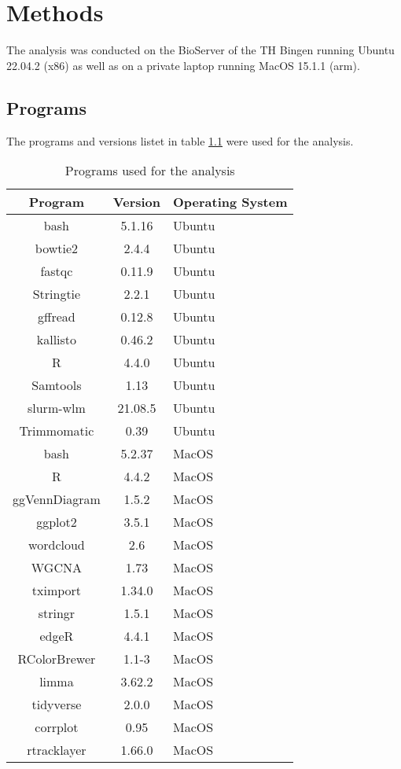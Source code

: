 \chapter{Methods}
The analysis was conducted on the BioServer of the TH Bingen running 
Ubuntu 22.04.2 (x86) as well as on a private laptop running MacOS 15.1.1 (arm). 
\section{Programs}
The programs and versions listet in table \ref{tab:programs} were used for the analysis.

\begin{table}[H]
	\center
	\caption{Programs used for the analysis}\label{tab:programs}
	\begin{tabular}{ccl}
		\toprule

    Program       & Version & Operating System        \\
		\midrule
    bash          & 5.1.16 & Ubuntu       \\
		bowtie2       & 2.4.4   & Ubuntu      \\
		fastqc        & 0.11.9    & Ubuntu    \\
		Stringtie & 2.2.1      & Ubuntu   \\
		gffread       & 0.12.8      & Ubuntu  \\
		kallisto      & 0.46.2       & Ubuntu \\
		R             & 4.4.0        & Ubuntu \\
		Samtools      & 1.13         & Ubuntu \\
		slurm-wlm          & 21.08.5 & Ubuntu \\
		Trimmomatic   & 0.39         & Ubuntu \\
    bash          & 5.2.37    & MacOS    \\
    R & 4.4.2 & MacOS \\
    ggVennDiagram             & 1.5.2  & MacOS       \\
    ggplot2           &   3.5.1   & MacOS   \\
    wordcloud            &   2.6  & MacOS    \\
    WGCNA           &   1.73   & MacOS   \\
    tximport          &     1.34.0 & MacOS   \\
    stringr        &     1.5.1  & MacOS  \\
    edgeR           &   4.4.1    & MacOS  \\
    RColorBrewer         &  1.1-3   & MacOS    \\
    limma         &  3.62.2    & MacOS   \\
    tidyverse         &  2.0.0    & MacOS   \\
    corrplot         &  0.95    & MacOS   \\
    rtracklayer         &  1.66.0 & MacOS \\
		\bottomrule
	\end{tabular}
\end{table}

